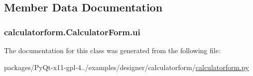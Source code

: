 \subsection{Member Data Documentation}
\hypertarget{classcalculatorform_1_1CalculatorForm_a5d869fbdc8952181edafe04c0488b6b0}{}
\subsubsection[{ui}]{\setlength{\rightskip}{0pt plus 5cm}calculatorform.\+Calculator\+Form.\+ui}\label{classcalculatorform_1_1CalculatorForm_a5d869fbdc8952181edafe04c0488b6b0}


The documentation for this class was generated from the following file\+:\begin{DoxyCompactItemize}
\item 
packages/\+Py\+Qt-\/x11-\/gpl-\/4../examples/designer/calculatorform/\hyperlink{calculatorform_8py}{calculatorform.\+py}\end{DoxyCompactItemize}
